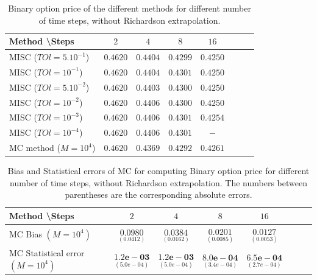 \documentclass[11pt]{article}
\begin{document}
\begin{table}[h!]
	\centering
	\begin{tabular}{l*{6}{c}r}
		Method \textbackslash  Steps            & $2$ & $4$ & $8$ & $16$ &   \\
		\hline
		MISC ($TOl=5.10^{-1}$)  & $0.4620$ & $0.4404$ & $0.4299$ & $0.4250$  \\
		MISC ($TOl=10^{-1}$)  & $0.4620$ & $0.4404$ & $0.4301$ & $0.4250$  \\
		MISC ($TOl=5.10^{-2}$)  & $0.4620$ & $0.4403$ & $0.4300$ & $0.4250$  \\
		MISC ($TOl=10^{-2}$)  & $0.4620$ & $0.4406$ &  $0.4300$ & $0.4250$  \\
		MISC ($TOl=10^{-3}$)  & $0.4620$ & $0.4406$ & $0.4301$  & $0.4254$  \\
		MISC ($TOl=10^{-4}$)  & $0.4620$ & $0.4406$ &  $0.4301$ & $-$  \\
		\hline
		MC method ($M=10^{4}$)   & $  0.4620$ & $    0.4369
		$  & $      0.4292$ & $  
		0.4261$ \\	
		\hline
	\end{tabular}
	\caption{Binary option price of the different methods for different number of time steps, without Richardson extrapolation.}
	\label{table: Binary option price of the different methods for different number of time steps, without Richardson extrapolation.}
\end{table}

\begin{table}[h!]
	\centering
	\begin{tabular}{l*{6}{c}r}
		Method \textbackslash  Steps            & $2$ & $4$ & $8$ & $16$  \\
		\hline
		MC Bias $(M=10^{4})$  & 	$ \underset{(    
			0.0412)}{\mathbf{0.0980}}$  & $\underset{( 0.0162)}{\mathbf{ 0.0384
		}}$  & $\underset{(    0.0085
	)}{\mathbf{0.0201}}$ & $\underset{(   0.0053)}{\mathbf{   0.0127}}$\\ 
		
		MC Statistical error $(M=10^{4})$  &  $\underset{( 5.0e-04)} {\mathbf{1.2e-03}}$  & $\underset{( 5.0e-04)} {\mathbf{1.2e-03}}$ & $\underset{(3.4e-04)} {\mathbf{8.0e-04}}$ & $\underset{( 2.7e-04)} {\mathbf{6.5e-04}}$	\\
		\hline
	\end{tabular}
	\caption{Bias and Statistical errors of MC  for computing Binary option price  for different number of time steps, without Richardson extrapolation. The numbers between parentheses are the corresponding absolute errors.}
	\label{Bias and Statistical errors of MC  for computing Binary option price  for different number of time steps, without Richardson extrapolation. The numbers between parentheses are the corresponding absolute errors.}
\end{table}
\end{document}
